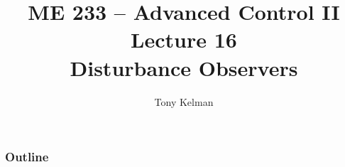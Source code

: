 \documentclass[mathserif]{beamer}              %
\title{ME 233 -- Advanced Control II\\
    Lecture 16 \\
    Disturbance Observers}
\author{Tony Kelman}
\institute{UC Berkeley}
\begin{document}
\maketitle

\begin{frame}
    \frametitle{Outline}
    \tableofcontents
\end{frame}






\end{document}
